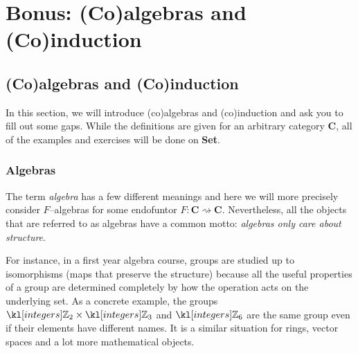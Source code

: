 \documentclass[main.tex]{subfiles}
\begin{document}
\chapter{Bonus: (Co)algebras and (Co)induction}\label{chap:coalgebra}
\section{(Co)algebras and (Co)induction}

In this section, we will introduce (co)algebras and (co)induction and ask you to fill out some gaps. While the definitions are given for an arbitrary category $\mathbf{C}$, all of the examples and exercises will be done on \textbf{Set}.

\subsection{Algebras}
The term \textit{algebra} has a few different meanings and here we will more precisely consider $F$--algebras for some endofuntor $F:\mathbf{C}\rightsquigarrow \mathbf{C}$. Nevertheless, all the objects that are referred to as algebras have a common motto: \textit{algebras only care about structure}.

For instance, in a first year algebra course, groups are studied up to isomorphisms (maps that preserve the structure) because all the useful properties of a group are determined completely by how the operation acts on the underlying set. As a concrete example, the groups $\Z_2 \times \Z_3$ and $\Z_6$ are the same group even if their elements have different names. It is a similar situation for rings, vector spaces and a lot more mathematical objects.
\end{document}
